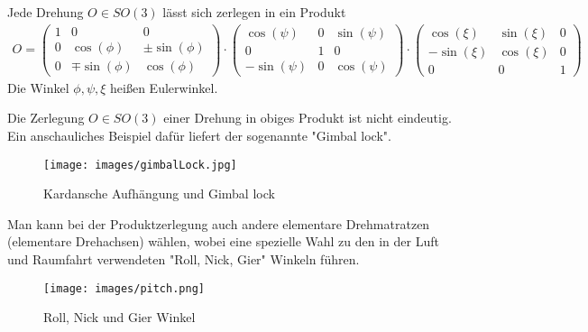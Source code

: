 \begin{Satz}
Jede Drehung  $O \in SO(3)$  lässt sich zerlegen in ein Produkt
\begin{align*}
O = 
\begin{pmatrix}
1 & 0 & 0 \\
0 & \cos(\phi) & \pm \sin(\phi) \\ 
 0 & \mp \sin(\phi) & \cos(\phi)
\end{pmatrix}
\cdot
\begin{pmatrix}
 \cos(\psi) & 0 &   \sin(\psi) \\ 
0 & 1 & 0 \\ 
- \sin(\psi) & 0& \cos(\psi)
\end{pmatrix}
\cdot \begin{pmatrix}
 \cos(\xi) &  \sin(\xi)  & 0\\ 
 - \sin(\xi) & \cos(\xi) & 0 \\
0 & 0 & 1 
\end{pmatrix} 
\end{align*} 
Die Winkel $\phi, \psi, \xi$ heißen  Eulerwinkel. 
\end{Satz}

\begin{Bemerkung}
Die  Zerlegung  $O \in SO(3)$  einer Drehung in obiges Produkt ist  nicht eindeutig.
Ein anschauliches Beispiel dafür liefert der sogenannte "Gimbal lock".
\end{Bemerkung}

\begin{figure}[H]
    \centering
    \texttt{[image: images/gimbalLock.jpg]}
    \caption{Kardansche Aufhängung und Gimbal lock}
    \label{fig:gimbal+lock}
\end{figure}

\begin{Bemerkung}
Man kann bei der Produktzerlegung auch andere elementare Drehmatratzen (elementare Drehachsen)  wählen, wobei
eine spezielle Wahl  zu den in der Luft und Raumfahrt verwendeten "Roll, Nick, Gier" Winkeln führen.
\end{Bemerkung}

\begin{figure}[H]
    \centering
    \texttt{[image: images/pitch.png]}
    \caption{Roll, Nick und Gier Winkel}
    \label{fig:roll-pitch-yaw}
\end{figure}

